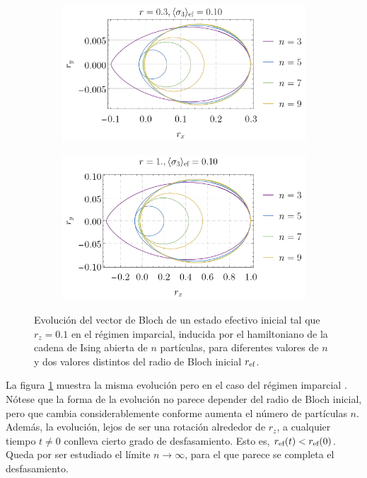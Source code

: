 \begin{figure}
    \centering
    \begin{subfigure}[b]{0.475\textwidth}
        \centering
        \includegraphics[width=\textwidth]{chapter3/figures_special/Ising_Boltz_r=0.3_z=0.10.png}
    \end{subfigure}
    \hfill
    \begin{subfigure}[b]{0.475\textwidth}  
        \centering 
        \includegraphics[width=\textwidth]{chapter3/figures_special/Ising_Boltz_r=1._z=0.10.png}
    \end{subfigure}
    \caption{Evolución del vector de Bloch de un estado efectivo inicial tal que $r_{z}=0.1$ en el régimen imparcial, inducida por el hamiltoniano de la cadena de Ising abierta de $n$ partículas, para diferentes valores de $n$ y dos valores distintos del radio de Bloch inicial $r_{\text{ef}}$.}
    \label{fig:OpenIsingBoltz}
\end{figure}

La figura \ref{fig:OpenIsingBoltz} muestra la misma evolución pero en el caso del régimen imparcial  . Nótese que la forma de la evolución no parece depender del radio de Bloch inicial, pero que cambia considerablemente conforme aumenta el número de partículas $n$. Además, la evolución, lejos de ser una rotación alrededor de $r_{z}$, a cualquier tiempo $t\neq 0$ conlleva cierto grado de desfasamiento. Esto es, $r_{\text{ef}}(t)<r_{\text{ef}}(0)$. Queda por ser estudiado el límite $n\rightarrow\infty$, para el que parece se completa el desfasamiento.

